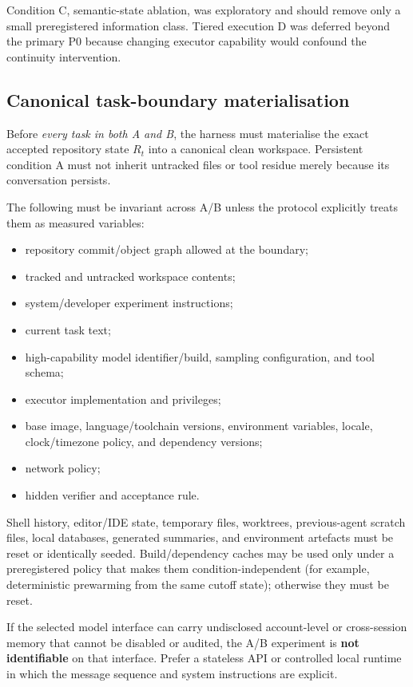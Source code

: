 Condition C, semantic-state ablation, was exploratory and should remove only a small preregistered information class. Tiered execution D was deferred beyond the primary P0 because changing executor capability would confound the continuity intervention.

\subsection{Canonical task-boundary materialisation}

Before \emph{every task in both A and B}, the harness must materialise the exact accepted repository state $R_t$ into a canonical clean workspace. Persistent condition A must not inherit untracked files or tool residue merely because its conversation persists.

The following must be invariant across A/B unless the protocol explicitly treats them as measured variables:
\begin{itemize}
    \item repository commit/object graph allowed at the boundary;
    \item tracked and untracked workspace contents;
    \item system/developer experiment instructions;
    \item current task text;
    \item high-capability model identifier/build, sampling configuration, and tool schema;
    \item executor implementation and privileges;
    \item base image, language/toolchain versions, environment variables, locale, clock/timezone policy, and dependency versions;
    \item network policy;
    \item hidden verifier and acceptance rule.
\end{itemize}

Shell history, editor/IDE state, temporary files, worktrees, previous-agent scratch files, local databases, generated summaries, and environment artefacts must be reset or identically seeded. Build/dependency caches may be used only under a preregistered policy that makes them condition-independent (for example, deterministic prewarming from the same cutoff state); otherwise they must be reset.

If the selected model interface can carry undisclosed account-level or cross-session memory that cannot be disabled or audited, the A/B experiment is \textbf{not identifiable} on that interface. Prefer a stateless API or controlled local runtime in which the message sequence and system instructions are explicit.

